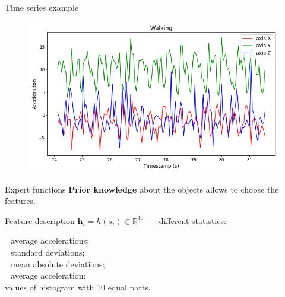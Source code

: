 \documentclass{beamer}
\begin{document}
\begin{frame}{Time series example}
	\begin{figure}[h]
		\centering
		\includegraphics[width=1\linewidth]{ts_example.png}
		\label{ts_example}
	\end{figure}
\end{frame}
\begin{frame}{Expert functions}
	\textbf{Prior knowledge} about the objects allows to choose the features.
	\vfill
	\begin{block}{Feature description}
		$\bm{h}_i = h\left(s_i\right)\in \mathbb{R}^{40}$~--- different statistics:
		
		\hspace{0.5cm}$\:\,$ average accelerations;\\
		\hspace{0.5cm}$\:\,$ standard deviations;\\
		\hspace{0.5cm}$\:\,$ mean absolute deviations;\\
		\hspace{0.5cm}$\:\,$ average acceleration;\\
		\hspace{0.5cm} values of histogram with 10 equal parts.
	\end{block}

\end{frame}
\end{document}
